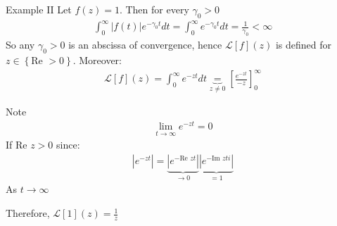 \begin{parag}{Example II}
    Let $f\left(z\right) = 1$. Then for every $\gamma_0 > 0$
	\begin{align*} 
		\int_{0}^{\infty}\left|f\left(t\right)\right|e^{-\gamma_0 t}dt =  \int_{0}^{\infty}e^{-\gamma_0 t}dt = \frac{1}{\gamma_0} < \infty
	\end{align*}
	So any $\gamma_0 > 0$ is an abscissa of convergence, hence $\mathcal{L}\left[f\right]\left(z\right)$ is defined for $z \in \left\{\text{Re } > 0\right\}$. Moreover:
	\begin{align*} 
		\mathcal{L}[f]\left(z\right) = \int_{0}^{\infty}e^{-zt} dt \underbrace{= }_{z \neq 0}\left[\frac{e^{-zt}}{-z}\right]_{0}^{\infty}
	\end{align*}
	\begin{subparag}{Note}
	    \begin{align*} 
			\lim_{t \to \infty} e^{-zt} =  0
		\end{align*}
		If $\text{Re }z > 0$ since:
		\begin{align*} 
			\left|e^{-zt}\right| = \underbrace{\left|e^{- \text{Re }zt}\right|}_{\to 0}\underbrace{\left|e^{- \text{Im }z ti}\right|}_{= 1}
		\end{align*}
		As $t \to \infty$
	\end{subparag}
	Therefore, $\mathcal{L}\left[1\right]\left(z\right) = \frac{1}{z}$
\end{parag}


